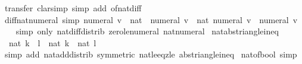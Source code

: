 \begin{isabellebody}
%
\isatagproof
{}\isamarkupfalse%
\ transfer\ {\isacharparenleft}{\kern0pt}clarsimp\ simp\ add{\isacharcolon}{\kern0pt}\ of{\isacharunderscore}{\kern0pt}nat{\isacharunderscore}{\kern0pt}diff{\isacharparenright}{\kern0pt}%
\endisatagproof
{\isafoldproof}%
%
\isadelimproof
\isanewline
%
\endisadelimproof
\isanewline
{}\isamarkupfalse%
\ diff{\isacharunderscore}{\kern0pt}nat{\isacharunderscore}{\kern0pt}numeral\ {\isacharbrackleft}{\kern0pt}simp{\isacharbrackright}{\kern0pt}{\isacharcolon}{\kern0pt}\ {\isachardoublequoteopen}{\isacharparenleft}{\kern0pt}numeral\ v\ {\isacharcolon}{\kern0pt}{\isacharcolon}{\kern0pt}\ nat{\isacharparenright}{\kern0pt}\ {\isacharminus}{\kern0pt}\ numeral\ v{\isacharprime}{\kern0pt}\ {\isacharequal}{\kern0pt}\ nat\ {\isacharparenleft}{\kern0pt}numeral\ v\ {\isacharminus}{\kern0pt}\ numeral\ v{\isacharprime}{\kern0pt}{\isacharparenright}{\kern0pt}{\isachardoublequoteclose}\isanewline
%
\isadelimproof
\ \ %
\endisadelimproof
%
\isatagproof
{}\isamarkupfalse%
\ {\isacharparenleft}{\kern0pt}simp\ only{\isacharcolon}{\kern0pt}\ nat{\isacharunderscore}{\kern0pt}diff{\isacharunderscore}{\kern0pt}distrib{\isacharprime}{\kern0pt}\ zero{\isacharunderscore}{\kern0pt}le{\isacharunderscore}{\kern0pt}numeral\ nat{\isacharunderscore}{\kern0pt}numeral{\isacharparenright}{\kern0pt}%
\endisatagproof
{\isafoldproof}%
%
\isadelimproof
\isanewline
%
\endisadelimproof
\isanewline
{}\isamarkupfalse%
\ nat{\isacharunderscore}{\kern0pt}abs{\isacharunderscore}{\kern0pt}triangle{\isacharunderscore}{\kern0pt}ineq{\isacharcolon}{\kern0pt}\isanewline
\ \ {\isachardoublequoteopen}nat\ {\isasymbar}k\ {\isacharplus}{\kern0pt}\ l{\isasymbar}\ {\isasymle}\ nat\ {\isasymbar}k{\isasymbar}\ {\isacharplus}{\kern0pt}\ nat\ {\isasymbar}l{\isasymbar}{\isachardoublequoteclose}\isanewline
%
\isadelimproof
\ \ %
\endisadelimproof
%
\isatagproof
{}\isamarkupfalse%
\ {\isacharparenleft}{\kern0pt}simp\ add{\isacharcolon}{\kern0pt}\ nat{\isacharunderscore}{\kern0pt}add{\isacharunderscore}{\kern0pt}distrib\ {\isacharbrackleft}{\kern0pt}symmetric{\isacharbrackright}{\kern0pt}\ nat{\isacharunderscore}{\kern0pt}le{\isacharunderscore}{\kern0pt}eq{\isacharunderscore}{\kern0pt}zle\ abs{\isacharunderscore}{\kern0pt}triangle{\isacharunderscore}{\kern0pt}ineq{\isacharparenright}{\kern0pt}%
\endisatagproof
{\isafoldproof}%
%
\isadelimproof
\isanewline
%
\endisadelimproof
\isanewline
{}\isamarkupfalse%
\ nat{\isacharunderscore}{\kern0pt}of{\isacharunderscore}{\kern0pt}bool\ {\isacharbrackleft}{\kern0pt}simp{\isacharbrackright}{\kern0pt}{\isacharcolon}{\kern0pt}\isanewline

\end{isabellebody}
